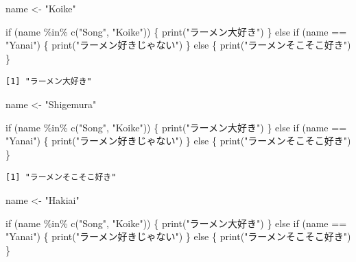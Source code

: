 \documentclass[
  a4paper,
  pandoc,
  ja=standard,
  jafont=haranoaji]{bxjsbook}
\newenvironment{Shaded}{\begin{snugshade}}{\end{snugshade}}
\newcommand{\ControlFlowTok}[1]{\textcolor[rgb]{0.00,0.48,0.65}{#1}}
\newcommand{\FunctionTok}[1]{\textcolor[rgb]{0.28,0.35,0.67}{#1}}
\newcommand{\NormalTok}[1]{\textcolor[rgb]{0.00,0.48,0.65}{#1}}
\newcommand{\OtherTok}[1]{\textcolor[rgb]{0.00,0.48,0.65}{#1}}
\newcommand{\SpecialCharTok}[1]{\textcolor[rgb]{0.37,0.37,0.37}{#1}}
\newcommand{\StringTok}[1]{\textcolor[rgb]{0.13,0.47,0.30}{#1}}
\begin{document}
\begin{Shaded}
\begin{Highlighting}[numbers=left,,]
\NormalTok{name }\OtherTok{\textless{}{-}} \StringTok{"Koike"}

\ControlFlowTok{if}\NormalTok{ (name }\SpecialCharTok{\%in\%} \FunctionTok{c}\NormalTok{(}\StringTok{"Song"}\NormalTok{, }\StringTok{"Koike"}\NormalTok{)) \{}
  \FunctionTok{print}\NormalTok{(}\StringTok{"ラーメン大好き"}\NormalTok{)}
\NormalTok{\} }\ControlFlowTok{else} \ControlFlowTok{if}\NormalTok{ (name }\SpecialCharTok{==} \StringTok{"Yanai"}\NormalTok{) \{}
  \FunctionTok{print}\NormalTok{(}\StringTok{"ラーメン好きじゃない"}\NormalTok{)}
\NormalTok{\} }\ControlFlowTok{else}\NormalTok{ \{}
  \FunctionTok{print}\NormalTok{(}\StringTok{"ラーメンそこそこ好き"}\NormalTok{)}
\NormalTok{\}}
\end{Highlighting}
\end{Shaded}

\begin{verbatim}
[1] "ラーメン大好き"
\end{verbatim}

\begin{Shaded}
\begin{Highlighting}[numbers=left,,]
\NormalTok{name }\OtherTok{\textless{}{-}} \StringTok{"Shigemura"}

\ControlFlowTok{if}\NormalTok{ (name }\SpecialCharTok{\%in\%} \FunctionTok{c}\NormalTok{(}\StringTok{"Song"}\NormalTok{, }\StringTok{"Koike"}\NormalTok{)) \{}
  \FunctionTok{print}\NormalTok{(}\StringTok{"ラーメン大好き"}\NormalTok{)}
\NormalTok{\} }\ControlFlowTok{else} \ControlFlowTok{if}\NormalTok{ (name }\SpecialCharTok{==} \StringTok{"Yanai"}\NormalTok{) \{}
  \FunctionTok{print}\NormalTok{(}\StringTok{"ラーメン好きじゃない"}\NormalTok{)}
\NormalTok{\} }\ControlFlowTok{else}\NormalTok{ \{}
  \FunctionTok{print}\NormalTok{(}\StringTok{"ラーメンそこそこ好き"}\NormalTok{)}
\NormalTok{\}}
\end{Highlighting}
\end{Shaded}

\begin{verbatim}
[1] "ラーメンそこそこ好き"
\end{verbatim}

\begin{Shaded}
\begin{Highlighting}[numbers=left,,]
\NormalTok{name }\OtherTok{\textless{}{-}} \StringTok{"Hakiai"}

\ControlFlowTok{if}\NormalTok{ (name }\SpecialCharTok{\%in\%} \FunctionTok{c}\NormalTok{(}\StringTok{"Song"}\NormalTok{, }\StringTok{"Koike"}\NormalTok{)) \{}
  \FunctionTok{print}\NormalTok{(}\StringTok{"ラーメン大好き"}\NormalTok{)}
\NormalTok{\} }\ControlFlowTok{else} \ControlFlowTok{if}\NormalTok{ (name }\SpecialCharTok{==} \StringTok{"Yanai"}\NormalTok{) \{}
  \FunctionTok{print}\NormalTok{(}\StringTok{"ラーメン好きじゃない"}\NormalTok{)}
\NormalTok{\} }\ControlFlowTok{else}\NormalTok{ \{}
  \FunctionTok{print}\NormalTok{(}\StringTok{"ラーメンそこそこ好き"}\NormalTok{)}
\NormalTok{\}}
\end{Highlighting}
\end{Shaded}
\end{document}
